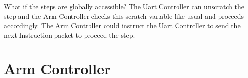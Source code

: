 \documentclass[12pt]{article}
\begin{document}
What if the steps are globally accessible?
The Uart Controller can unscratch the step and the Arm Controller checks this scratch variable like usual and proceeds accordingly.
The Arm Controller could instruct the Uart Controller to send the next Instruction packet to proceed the step.
\section{Arm Controller}
\end{document}
